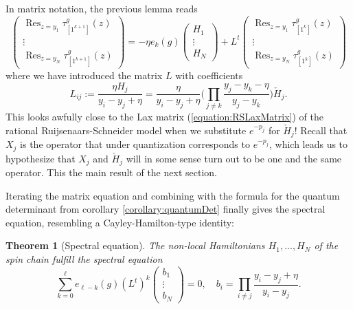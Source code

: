 \documentclass[11pt]{report}
\newtheorem{theorem}{Theorem}[section]
\theoremstyle{definition}
\theoremstyle{remark}
\theoremstyle{remark}
\begin{document}
In matrix notation, the previous lemma reads
\begin{equation*}
\begin{pmatrix}
\operatorname{Res}_{z=y_1} \tau_{[1^{k+1}]}^g(z) \\
\vdots \\
\operatorname{Res}_{z=y_N} \tau_{[1^{k+1}]}^g(z)
\end{pmatrix}
=
-\eta e_k(g)
\begin{pmatrix}
H_1 \\
\vdots \\
H_N
\end{pmatrix}
+L^t
\begin{pmatrix}
\operatorname{Res}_{z=y_1} \tau_{[1^k]}^g(z) \\
\vdots \\
\operatorname{Res}_{z=y_N} \tau_{[1^k]}^g(z)
\end{pmatrix}
\end{equation*}
where we have introduced the matrix $L$ with coefficients
\begin{equation*}
L_{ij} := \frac{\eta H_j}{y_i-y_j+\eta} = \frac{\eta}{y_i-y_j+\eta} \bigg( \prod_{j \neq k} \frac{y_j-y_k-\eta}{y_j-y_k} \bigg) \check H_j.
\end{equation*}
This looks awfully close to the Lax matrix (\ref{equation:RSLaxMatrix}) of the rational Ruijsenaars-Schneider model when we substitute $e^{-p_j}$ for $\check H_j$! Recall that $X_j$ is the operator that under quantization corresponds to $e^{-p_j}$, which leads us to hypothesize that $X_j$ and $\check H_j$ will in some sense turn out to be one and the same operator. This the main result of the next section.

Iterating the matrix equation and combining with the formula for the quantum determinant from corollary \ref{corollary:quantumDet} finally gives the spectral equation, resembling a Cayley-Hamilton-type identity:

\begin{theorem}[Spectral equation]\label{theorem:spectralEq}
The non-local Hamiltonians $H_1,...,H_N$ of the spin chain fulfill the \emph{spectral equation}
\begin{equation}\label{equation:spectralEq}
\sum_{k=0}^\ell e_{\ell-k}(g) (L^t)^k
\begin{pmatrix}
b_1 \\ \vdots \\ b_N
\end{pmatrix}
= 0, \quad b_i = \prod_{i \neq j} \frac{y_i-y_j+\eta}{y_i-y_j}.
\end{equation}
\end{theorem}
\end{document}
